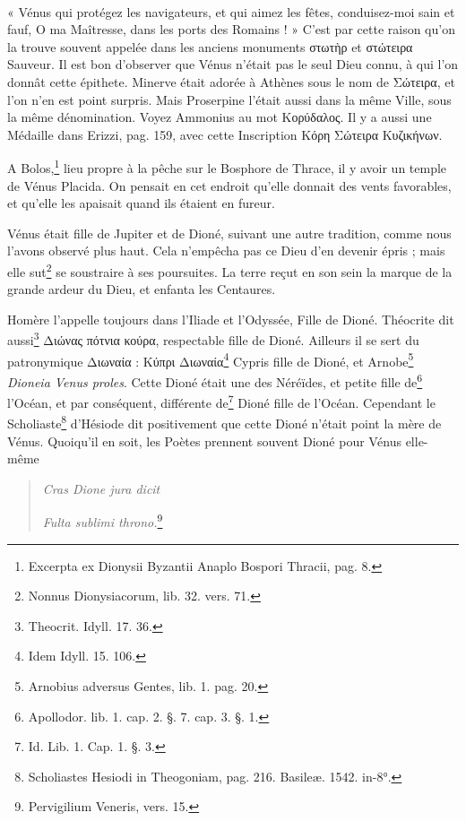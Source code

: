 \documentclass[a4paper, 18pt, oneside]{article}
\begin{document}
\paragraph{}
« Vénus qui protégez les navigateurs, et qui aimez les fêtes, conduisez-moi sain et fauf, O ma Maîtresse, dans les ports des Romains ! » C'est par cette raison qu'on la trouve souvent appelée dans les anciens monuments στωτὴρ et στώτειρα Sauveur. Il est bon d'observer que Vénus n'était pas le seul Dieu connu, à qui l'on donnât cette épithete. Minerve était adorée à Athènes sous le nom de Σώτειρα, et l'on n'en est point surpris. Mais Proserpine l'était aussi dans la même Ville, sous la même dénomination. Voyez Ammonius au mot Κορύδαλος. Il y a aussi une Médaille dans Erizzi, pag. 159, avec cette Inscription Κόρη Σώτειρα Κυζικήνων.

A Bolos,\footnote{Excerpta ex Dionysii Byzantii Anaplo Bospori Thracii, pag. 8.} lieu propre à la pêche sur le Bosphore de Thrace, il y avoir un temple de Vénus Placida. On pensait en cet endroit qu'elle donnait des vents favorables, et qu'elle les apaisait quand ils étaient en fureur.

Vénus était fille de Jupiter et de Dioné, suivant une autre tradition, comme nous l'avons observé plus haut. Cela n'empêcha pas ce Dieu d'en devenir épris ; mais elle sut\footnote{Nonnus Dionysiacorum, lib. 32. vers. 71.} se soustraire à ses poursuites. La terre reçut en son sein la marque de la grande ardeur du Dieu, et enfanta les Centaures.

Homère l'appelle toujours dans l'Iliade et l'Odyssée, Fille de Dioné. Théocrite dit aussi\footnote{Theocrit. Idyll. 17. 36.} Διώνας πότνια κούρα, respectable fille de Dioné. Ailleurs il se sert du patronymique Διωναία : Κύπρι Διωναία\footnote{Idem Idyll. 15. 106.} Cypris fille de Dioné, et Arnobe\footnote{Arnobius adversus Gentes, lib. 1. pag. 20.} \emph{Dioneia Venus proles}. Cette Dioné était une des Néréïdes, et petite fille de\footnote{Apollodor. lib. 1. cap. 2. §. 7. cap. 3. §. 1.} l'Océan, et par conséquent, différente de\footnote{Id. Lib. 1. Cap. 1. §. 3.} Dioné fille de l'Océan. Cependant le Scholiaste\footnote{Scholiastes Hesiodi in Theogoniam, pag. 216. Basileæ. 1542. in-8°.} d'Hésiode dit positivement que cette Dioné n'était point la mère de Vénus. Quoiqu'il en soit, les Poètes prennent souvent Dioné pour Vénus elle-même
\begin{quotation}
\emph{Cras Dione jura dicit}

\hspace*{5mm}\emph{Fulta sublimi throno.}\footnote{Pervigilium Veneris, vers. 15.}
\end{quotation}
\end{document}
